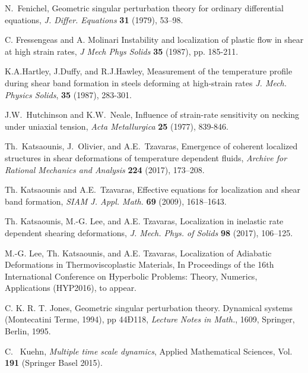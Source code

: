 \documentclass[11pt]{article}
\theoremstyle{remark}
\begin{document}
\begin{thebibliography}{10}
{\sc N.~Fenichel},
Geometric singular perturbation theory for ordinary differential equations,
{\it J. Differ. Equations} {\bf 31} (1979), 53--98.

{\sc C. Fressengeas and A. Molinari }
{ Instability and localization of plastic flow in shear at high strain rates}, {\it J Mech Phys Solids} {\bf 35} (1987), pp. 185-211.


{\sc K.A.Hartley, J.Duffy, and R.J.Hawley},
{ Measurement of the temperature profile during shear band formation in steels deforming at high-strain rates}
{\it  J. Mech. Physics Solids}, {\bf 35} (1987), 283-301.


{\sc J.W.~Hutchinson and K.W.~Neale},
Influence of strain-rate sensitivity on necking under uniaxial tension,
{\it  Acta Metallurgica} {\bf 25} (1977), 839-846.

{\sc Th.~Katsaounis, J.~Olivier, and A.E.~Tzavaras},
Emergence of coherent localized structures in shear deformations of temperature dependent fluids,
{\it Archive for Rational Mechanics and Analysis} {\bf 224} (2017), 173--208.

{\sc Th. Katsaounis and A.E.~Tzavaras},
Effective equations for localization and shear band formation,
{\it SIAM J. Appl. Math.}  {\bf 69} (2009), 1618--1643.

{\sc Th. Katsaounis, M.-G. Lee, and A.E. Tzavaras},
Localization in inelastic rate dependent shearing deformations,
{\it J. Mech. Phys. of Solids} {\bf 98} (2017), 106--125.

{\sc M.-G. Lee, Th. Katsaounis, and A.E. Tzavaras},
Localization of Adiabatic Deformations in Thermoviscoplastic Materials, In Proceedings of the 16th International Conference on Hyperbolic Problems: Theory, Numerics, Applications (HYP2016), to appear.

{\sc C. K. R. T.  Jones},
Geometric singular perturbation theory.
Dynamical systems (Montecatini Terme, 1994), pp 44Ð118, {\it Lecture Notes in Math.}, 1609, Springer, Berlin, 1995.


{\sc C.~ Kuehn},
{\it Multiple time scale dynamics}, Applied Mathematical Sciences, Vol. {\bf 191} (Springer Basel 2015).


\end{thebibliography}
\end{document}
